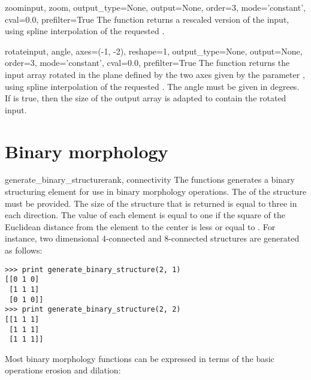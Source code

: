 \begin{funcdesc}{zoom}{input, zoom, output_type=None, output=None, order=3, 
    mode='constant', cval=0.0, prefilter=True} The  function
  returns a rescaled version of the input, using spline interpolation of 
  the requested .
\end{funcdesc}

\begin{funcdesc}{rotate}{input, angle, axes=(-1, -2), reshape=1,
    output_type=None, output=None, order=3, mode='constant', cval=0.0,
    prefilter=True} The  function returns the input array
  rotated in the plane defined by the two axes given by the parameter
  , using spline interpolation of the requested . The
  angle must be given in degrees. If  is true, then the size 
  of the output array is adapted to contain the rotated input.
\end{funcdesc}

\section{Binary morphology}
\label{sec:ndimage:binary-morphology}

\begin{funcdesc}{generate_binary_structure}{rank, connectivity}
  The  functions generates a binary
  structuring element for use in binary morphology operations. The 
   of the structure must be provided. The size of the structure 
  that is returned is equal to three in each direction. The value of each 
  element is equal to one if the square of the Euclidean distance from the 
  element to the center is less or equal to . For 
  instance, two dimensional 4-connected and 8-connected structures are 
  generated as follows:
\begin{verbatim}
>>> print generate_binary_structure(2, 1)
[[0 1 0]
 [1 1 1]
 [0 1 0]]
>>> print generate_binary_structure(2, 2)
[[1 1 1]
 [1 1 1]
 [1 1 1]]
\end{verbatim}
\end{funcdesc}

Most binary morphology functions can be expressed in terms of the basic
operations erosion and dilation:

